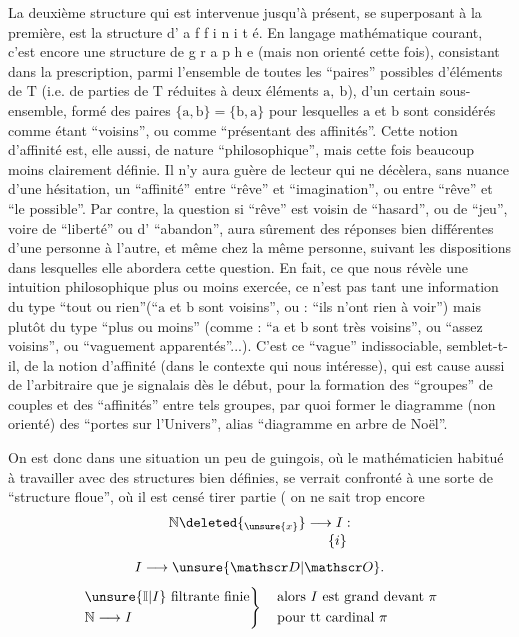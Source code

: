 La deuxième structure qui est intervenue jusqu'à présent, se superposant à la première, est la structure d' a f f i n i t é. En langage mathématique courant, c'est encore une structure de g r a p h e (mais non orienté cette fois), consistant dans la prescription, parmi l'ensemble de toutes les ``paires'' possibles d'éléments de $\mathrm T$ (i.e. de parties de $\mathrm T$ réduites à deux éléments $\mathrm a,\ \mathrm b$), d'un certain sous-ensemble, formé des paires $\{\mathrm a,\mathrm b\}=\{\mathrm b,\mathrm a\}$ pour lesquelles $\mathrm a$ et $\mathrm b$ sont considérés comme étant ``voisins'', ou comme ``présentant des affinités''. Cette notion d'affinité est, elle aussi, de nature ``philosophique'', mais cette fois beaucoup moins clairement définie. Il n'y aura guère de lecteur qui ne décèlera, sans nuance d'une hésitation, un ``affinité'' entre ``rêve'' et ``imagination'', ou entre ``rêve'' et ``le possible''. Par contre, la question si ``rêve'' est voisin de ``hasard'', ou de ``jeu'', voire de ``liberté'' ou d' ``abandon'', aura sûrement des réponses bien différentes d'une personne à l'autre, et même chez la même personne, suivant les dispositions dans lesquelles elle abordera cette question. En fait, ce que nous révèle une intuition philosophique plus ou moins exercée, ce n'est pas tant une information du type ``tout ou rien''(``$\mathrm a$ et $\mathrm b$ sont voisins'', ou : ``ils n'ont rien à voir'') mais plutôt du type ``plus ou moins'' (comme : ``$\mathrm a$ et $\mathrm b$ sont très voisins'', ou ``assez voisins'', ou ``vaguement apparentés''...). C'est ce ``vague'' indissociable, semblet-t-il, de la notion d'affinité (dans le contexte qui nous intéresse), qui est cause aussi de l'arbitraire que je signalais dès le début, pour la formation des ``groupes'' de couples et des ``affinités'' entre tels groupes, par quoi former le diagramme (non orienté) des ``portes sur l'Univers'', alias ``diagramme en arbre de Noël''.

On est donc dans une situation un peu de guingois, où le mathématicien habitué à travailler avec des structures bien définies, se verrait confronté à une \margin{\handwritten{\unsure{$\times$|*}}}sorte de ``structure floue'', où il est censé tirer partie ( on ne sait trop encore
\[
\begin{aligned}
\mathbb N\deleted{_{\unsure{x}}}&\longrightarrow I: \\[-2pt]
&\phantom{\longrightarrow}\{i\}
\end{aligned}
\]
\[
 I\longrightarrow\unsure{\mathscr D|\mathscr O}.
\]
\[
\left.\begin{aligned}
 &\unsure{\mathbb I|I}\ \text{filtrante finie}\\
 &\mathbb N\longrightarrow I
\end{aligned}\right\}\quad
\begin{aligned}
 &\text{alors $I$ est grand devant $\pi$}\\
 &\text{pour tt cardinal $\pi$}
\end{aligned}
\]

